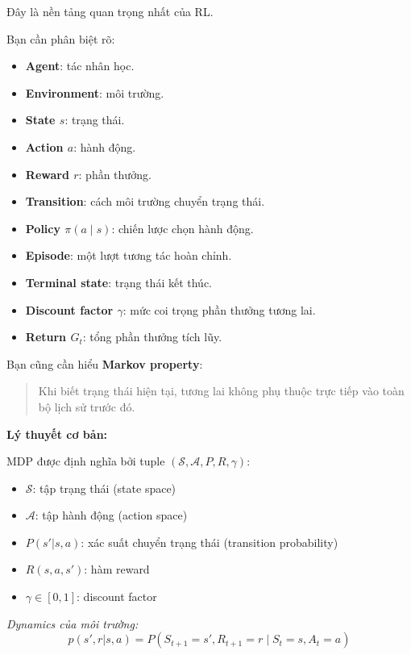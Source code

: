 \documentclass[12pt,a4paper]{article}
\begin{document}
Đây là nền tảng quan trọng nhất của RL.

Bạn cần phân biệt rõ:

\begin{itemize}[leftmargin=1.5em]
    \item \textbf{Agent}: tác nhân học.
    \item \textbf{Environment}: môi trường.
    \item \textbf{State $s$}: trạng thái.
    \item \textbf{Action $a$}: hành động.
    \item \textbf{Reward $r$}: phần thưởng.
    \item \textbf{Transition}: cách môi trường chuyển trạng thái.
    \item \textbf{Policy $\pi(a\mid s)$}: chiến lược chọn hành động.
    \item \textbf{Episode}: một lượt tương tác hoàn chỉnh.
    \item \textbf{Terminal state}: trạng thái kết thúc.
    \item \textbf{Discount factor $\gamma$}: mức coi trọng phần thưởng tương lai.
    \item \textbf{Return $G_t$}: tổng phần thưởng tích lũy.
\end{itemize}

Bạn cũng cần hiểu \textbf{Markov property}:

\begin{quote}
Khi biết trạng thái hiện tại, tương lai không phụ thuộc trực tiếp vào toàn bộ lịch sử trước đó.
\end{quote}

\textbf{Lý thuyết cơ bản:}

MDP được định nghĩa bởi tuple $(\mathcal{S}, \mathcal{A}, P, R, \gamma)$:

\begin{itemize}[leftmargin=1.5em]
    \item $\mathcal{S}$: tập trạng thái (state space)
    \item $\mathcal{A}$: tập hành động (action space)
    \item $P(s'|s,a)$: xác suất chuyển trạng thái (transition probability)
    \item $R(s,a,s')$: hàm reward
    \item $\gamma \in [0,1]$: discount factor
\end{itemize}

\textit{Dynamics của môi trường:}
\begin{equation}
p(s',r|s,a) = P(S_{t+1}=s', R_{t+1}=r \mid S_t=s, A_t=a)
\end{equation}
\end{document}

